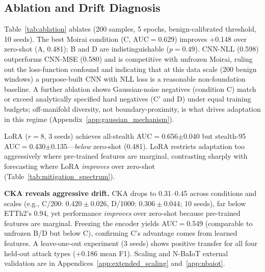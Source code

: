 \subsection{Ablation and Drift Diagnosis}
\label{sec:experiments:ablation}



Table~\ref{tab:ablation} ablates \ours{} (200 samples, 5 epochs,
benign-calibrated threshold, 10 seeds).
The best Moirai condition (C, AUC$=$0.629) improves $+$0.148 over zero-shot
(A, 0.481); B and D are indistinguishable ($p{=}0.49$).
CNN-NLL (0.598) outperforms CNN-MSE (0.580) and is competitive with
unfrozen Moirai, ruling out the loss-function confound and indicating
that at this data scale (200 benign windows) a purpose-built CNN with
NLL loss is a reasonable non-foundation baseline.
A further ablation shows Gaussian-noise negatives (condition C) match or
exceed analytically specified hard negatives (C$'$ and D) under equal
training budgets; off-manifold diversity, not boundary-proximity, is
what drives adaptation in this regime (Appendix~\ref{app:gaussian_mechanism}).

LoRA ($r{=}8$, 3 seeds) achieves all-stealth AUC$=$0.656$\pm$0.040 but
stealth-95 AUC$=$0.430$\pm$0.135---\emph{below} zero-shot (0.481).
LoRA restricts adaptation too aggressively where pre-trained features
are marginal, contrasting sharply with forecasting where LoRA
\emph{improves} over zero-shot (Table~\ref{tab:mitigation_spectrum}).

\label{sec:experiments:constraints}

\textbf{CKA reveals aggressive drift.}
CKA drops to 0.31--0.45 across conditions and scales
(e.g., C/200: $0.420\pm0.026$, D/1000: $0.306\pm0.044$; 10 seeds),
far below ETTh2's 0.94, yet performance
\emph{improves} over zero-shot because pre-trained features are marginal.
Freezing the encoder yields AUC$=$0.549 (comparable to unfrozen B/D
but below C), confirming C's advantage comes from learned features.
A leave-one-out experiment (3 seeds) shows positive transfer for all
four held-out attack types ($+$0.186 mean F1).
Scaling and N-BaIoT external validation are in
Appendices~\ref{app:extended_scaling} and~\ref{app:nbaiot}.
